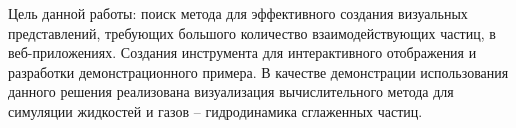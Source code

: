 Цель данной работы: поиск метода для эффективного создания визуальных представлений,
требующих большого количество взаимодействующих частиц,
в веб-приложениях. Создания инструмента для интерактивного отображения и разработки
демонстрационного примера. В качестве демонстрации использования данного решения реализована 
визуализация вычислительного метода для симуляции жидкостей и газов -- гидродинамика 
сглаженных частиц.


